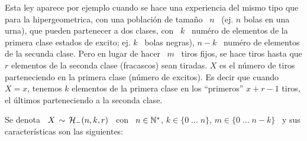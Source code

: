 \label{Sssec:MP:HipergeometricaNegativa}

Esta ley aparece  por ejemplo cuando se hace una experiencia  del mismo tipo que
para la hipergeometrica, con una poblaci\'on de tama\~no \ $n$ \ (ej.  $n$ bolas
en  una urna),  que pueden  partenecer a  dos clases,  con \  $k$ \  num\'ero de
elementos de la primera clase estados  de excito; ej. $k$ \ bolas negras), $n-k$
\ num\'ero  de elementos de la  secunda clase.  Pero en  lugar de hacer  \ $m$ \
tiros  fijos,  se  hace tiros  hasta  que  $r$  elementos  de la  seconda  clase
(fracascos)  sean tiradas.   $X$ es  el n\'umero  de tiros  parteneciendo  en la
primera clase  (n\'umero de excitos). Es decir  que cuando $X =  x$, tenemos $k$
elementos de  la primera clase en  los ``primeros'' $x+r-1$  tiros, el \'ultimos
parteneciendo a la seconda clase.

Se denota \ $X \,  \sim \, \mathcal{H}_-(n,k,r)$ \ con \ $n \in \mathbb{N}^*$,  \quad $k \in \{ 0 \;
\ldots \; n \}$, \quad $m \in \{  0 \; \ldots \; n-k \}$ \ y sus caracter\'isticas
son las siguientes:

